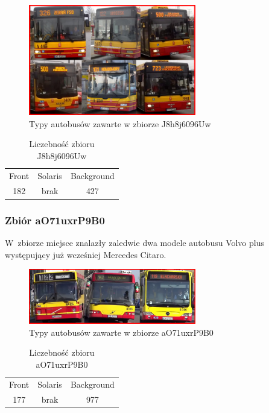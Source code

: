 \begin{figure}[!h]
    \centering
    \includegraphics[width=0.65\textwidth]{img/exp_trainig_data_J8h}
    \caption{Typy autobusów zawarte w zbiorze J8h8j6096Uw}
    \label{fig:J8h8j6096Uw_types}
\end{figure}

\begin{table}[!h]
    \centering
    \begin{tabular}{c|c|c}
        Front   & Solaris   & Background \\
        182     & brak      & 427 
    \end{tabular}
    \caption{Liczebność zbioru J8h8j6096Uw}
    \label{tab:J8h8j6096Uw_count}
\end{table}

\subsubsection{Zbiór aO71uxrP9B0}

W~zbiorze miejsce znalazły zaledwie dwa modele autobusu Volvo plus 
występujący już wcześniej Mercedes Citaro.

\begin{figure}[!h]
    \centering
    \includegraphics[width=0.65\textwidth]{img/exp_trainig_data_aO7}
    \caption{Typy autobusów zawarte w zbiorze aO71uxrP9B0}
    \label{fig:aO71uxrP9B0_types}
\end{figure}

\begin{table}[!h]
    \centering
    \begin{tabular}{c|c|c}
        Front   & Solaris   & Background \\
        177     & brak      & 977 
    \end{tabular}
    \caption{Liczebność zbioru aO71uxrP9B0}
    \label{tab:aO71uxrP9B0_count}
\end{table}

